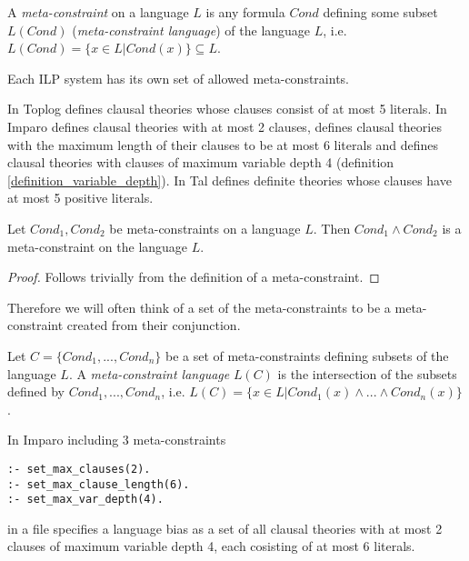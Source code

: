 \begin{defn}
A \emph{meta-constraint} on a language $L$ is any formula $Cond$ defining some subset $L(Cond)$ (\emph{meta-constraint language}) of the language $L$, i.e. $L(Cond)=\{x \in L | Cond(x)\}\subseteq L$.
\end{defn}

Each ILP system has its own set of allowed meta-constraints.
\begin{exmp}
In Toplog  defines clausal theories whose clauses consist of at most 5 literals.
In Imparo  defines clausal theories with at most 2 clauses,   defines clausal theories with the maximum length of their clauses to be at most 6 literals and
 defines clausal theories with clauses of maximum variable depth 4 (definition \ref{definition_variable_depth}).
In Tal  defines definite theories whose clauses have at most 5 positive literals.
\end{exmp}

\begin{proposition}
Let $Cond_1, Cond_2$ be meta-constraints on a language $L$.
Then $Cond_1 \land Cond_2$ is a meta-constraint on the language $L$.
\end{proposition}

\begin{proof}
Follows trivially from the definition of a meta-constraint.
\end{proof}

Therefore we will often think of a set of the meta-constraints to be a meta-constraint created from their conjunction.

\begin{defn}
Let $C=\{Cond_1, ..., Cond_n\}$ be a set of meta-constraints defining subsets of the language $L$.
A \emph{meta-constraint language} $L(C)$ is the intersection of the subsets defined by $Cond_1, ..., Cond_n$,
i.e. $L(C)=\{x \in L | Cond_1(x) \land ... \land Cond_n(x) \}$.
\end{defn}

\begin{exmp}
In Imparo including 3 meta-constraints
\begin{lstlisting}
:- set_max_clauses(2).
:- set_max_clause_length(6).
:- set_max_var_depth(4).
\end{lstlisting}
in a file specifies a language bias as a set of all clausal theories
with at most 2 clauses of maximum variable depth 4, each cosisting of at most 6 literals.
\end{exmp}

